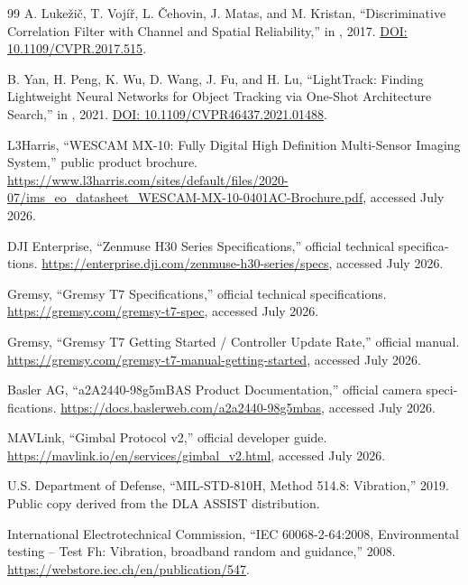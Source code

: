 \documentclass[12pt,a4paper]{article}
\newcommand{\EN}[1]{\lr{#1}}
\begin{document}
\begin{latin}
\begin{thebibliography}{99}
A. Luke\v{z}i\v{c}, T. Voj\'{i}\v{r}, L. \v{C}ehovin, J. Matas, and M. Kristan,
``Discriminative Correlation Filter with Channel and Spatial Reliability,''
in \EN{Proceedings of CVPR}, 2017.
\href{https://doi.org/10.1109/CVPR.2017.515}{DOI: 10.1109/CVPR.2017.515}.

B. Yan, H. Peng, K. Wu, D. Wang, J. Fu, and H. Lu,
``LightTrack: Finding Lightweight Neural Networks for Object Tracking via One-Shot Architecture Search,''
in \EN{Proceedings of CVPR}, 2021.
\href{https://doi.org/10.1109/CVPR46437.2021.01488}{DOI: 10.1109/CVPR46437.2021.01488}.

L3Harris,
``WESCAM MX-10: Fully Digital High Definition Multi-Sensor Imaging System,'' public product brochure.
\url{https://www.l3harris.com/sites/default/files/2020-07/ims_eo_datasheet_WESCAM-MX-10-0401AC-Brochure.pdf}, accessed July 2026.

DJI Enterprise,
``Zenmuse H30 Series Specifications,'' official technical specifications.
\url{https://enterprise.dji.com/zenmuse-h30-series/specs}, accessed July 2026.

Gremsy,
``Gremsy T7 Specifications,'' official technical specifications.
\url{https://gremsy.com/gremsy-t7-spec}, accessed July 2026.

Gremsy,
``Gremsy T7 Getting Started / Controller Update Rate,'' official manual.
\url{https://gremsy.com/gremsy-t7-manual-getting-started}, accessed July 2026.

Basler AG,
``a2A2440-98g5mBAS Product Documentation,'' official camera specifications.
\url{https://docs.baslerweb.com/a2a2440-98g5mbas}, accessed July 2026.

MAVLink,
``Gimbal Protocol v2,'' official developer guide.
\url{https://mavlink.io/en/services/gimbal_v2.html}, accessed July 2026.

U.S. Department of Defense,
``MIL-STD-810H, Method 514.8: Vibration,'' 2019.
Public copy derived from the DLA ASSIST distribution.

International Electrotechnical Commission,
``IEC 60068-2-64:2008, Environmental testing -- Test Fh: Vibration, broadband random and guidance,'' 2008.
\url{https://webstore.iec.ch/en/publication/547}.

\end{thebibliography}
\end{latin}
\end{document}
